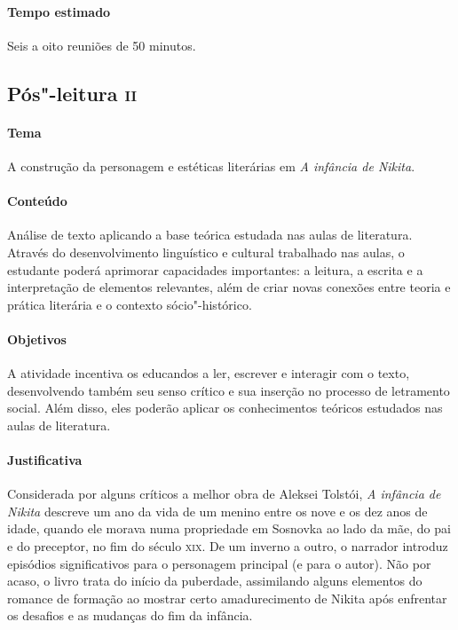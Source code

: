 \documentclass[11pt]{extarticle}
\begin{document}
\paragraph{Tempo estimado} Seis a oito reuniões de 50 minutos.

\subsection{Pós"-leitura \textsc{ii}}

\paragraph{Tema} A construção da personagem e estéticas literárias em \emph{A infância de Nikita}.



\paragraph{Conteúdo}
Análise de texto aplicando a base teórica estudada nas aulas de
literatura. Através do desenvolvimento linguístico e cultural trabalhado
nas aulas, o estudante poderá aprimorar capacidades importantes: a
leitura, a escrita e a interpretação de elementos relevantes, além de
criar novas conexões entre teoria e prática literária e o contexto
sócio"-histórico.

\paragraph{Objetivos}
A atividade incentiva os educandos a ler, escrever e interagir com o
texto, desenvolvendo também seu senso crítico e sua inserção no processo
de letramento social. Além disso, eles poderão aplicar os conhecimentos
teóricos estudados nas aulas de literatura.

\paragraph{Justificativa}
Considerada por alguns críticos a melhor obra de Aleksei Tolstói,
\emph{A infância de Nikita} descreve um ano da vida de um menino entre
os nove e os dez anos de idade, quando ele morava numa propriedade em
Sosnovka ao lado da mãe, do pai e do preceptor, no fim do século \textsc{xix}. De
um inverno a outro, o narrador introduz episódios significativos para o
personagem principal (e para o autor). Não por acaso, o livro trata do
início da puberdade, assimilando alguns elementos do romance de formação
ao mostrar certo amadurecimento de Nikita após enfrentar os desafios e
as mudanças do fim da infância.
\end{document}
